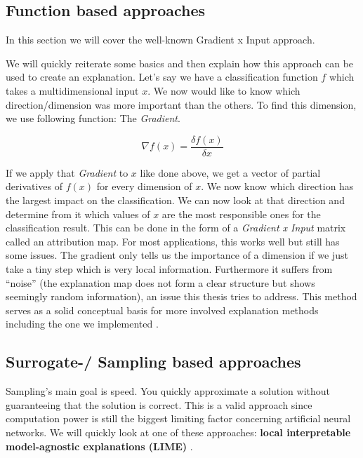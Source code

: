 \subsection{Function based approaches}

In this section we will cover the well-known Gradient x Input approach.

We will quickly reiterate some basics and then explain how this approach can be used to create an explanation. Let's say we have a classification function $f$ which takes a multidimensional input $x$. We now would like to know which direction/dimension was more important than the others. To find this dimension, we use following function: The \textit{Gradient}.

\begin{equation}
    \nabla f(x) = \frac{\delta f(x)}{\delta x}
\end{equation}

If we apply that \textit{Gradient} to $x$ like done above, we get a vector of partial derivatives of $f(x)$ for every dimension of $x$. We now know which direction has the largest impact on the classification. We can now look at that direction and determine from it which values of $x$ are the most responsible ones for the classification result. This can be done in the form of a \textit{Gradient x Input} matrix called an attribution map. For most applications, this works well but still has some issues. The gradient only tells us the importance of a dimension if we just take a tiny step which is very local information. Furthermore it suffers from \enquote{noise} (the explanation map does not form a clear structure but shows seemingly random information), an issue this thesis tries to address. This method serves as a solid conceptual basis for more involved explanation methods including the one we implemented \cite{GradientInput}.

\subsection{Surrogate-/ Sampling based approaches}

Sampling's main goal is speed. You quickly approximate a solution without guaranteeing that the solution is correct. This is a valid approach since computation power is still the biggest limiting factor concerning artificial neural networks. We will quickly look at one of these approaches: \textbf{local interpretable model-agnostic explanations (LIME)} \cite{Lime_paper}.


